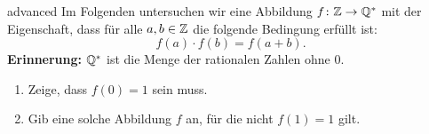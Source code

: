 \documentclass[../funktionen.tex]{subfiles}
\begin{document}
\begin{exercise}{advanced}
    Im Folgenden untersuchen wir eine Abbildung $f\colon\mathbb{Z}\rightarrow\mathbb{Q}^*$ mit der Eigenschaft, dass für alle $a,b\in\mathbb{Z}$ die folgende Bedingung erfüllt ist:\[f(a)\cdot f(b)=f(a+b).\]
    \textbf{Erinnerung:} $\mathbb{Q}^*$ ist die Menge der rationalen Zahlen ohne $0$.
    \begin{enumerate}
        \item Zeige, dass $f(0)=1$ sein muss.
        \item Gib eine solche Abbildung $f$ an, für die nicht $f(1)=1$ gilt.
        
    \end{enumerate}
\end{exercise}
\end{document}
